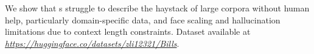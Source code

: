 %
%
%
%
We show that \mm{}s struggle to describe  the haystack of large corpora without human help, particularly domain-specific data, and face scaling and hallucination limitations due to context length constraints.
%
Dataset available at \textit{\url{https://huggingface.co/datasets/zli12321/Bills}}.


%
%
%


